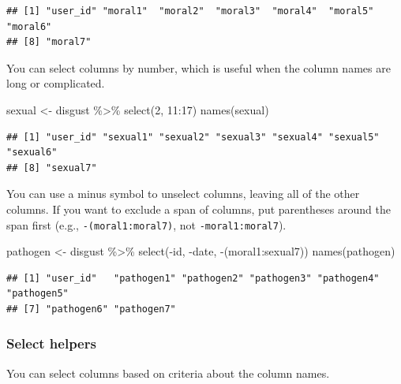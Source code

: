 \documentclass[
  oneside]{book}
\newenvironment{Shaded}{\begin{snugshade}}{\end{snugshade}}
\newcommand{\DecValTok}[1]{\textcolor[rgb]{0.00,0.00,0.81}{#1}}
\newcommand{\FunctionTok}[1]{\textcolor[rgb]{0.00,0.00,0.00}{#1}}
\newcommand{\NormalTok}[1]{#1}
\newcommand{\OtherTok}[1]{\textcolor[rgb]{0.56,0.35,0.01}{#1}}
\newcommand{\SpecialCharTok}[1]{\textcolor[rgb]{0.00,0.00,0.00}{#1}}
\begin{document}
\begin{verbatim}
## [1] "user_id" "moral1"  "moral2"  "moral3"  "moral4"  "moral5"  "moral6" 
## [8] "moral7"
\end{verbatim}

You can select columns by number, which is useful when the column names are long or complicated.

\begin{Shaded}
\begin{Highlighting}[]
\NormalTok{sexual }\OtherTok{\textless{}{-}}\NormalTok{ disgust }\SpecialCharTok{\%\textgreater{}\%} \FunctionTok{select}\NormalTok{(}\DecValTok{2}\NormalTok{, }\DecValTok{11}\SpecialCharTok{:}\DecValTok{17}\NormalTok{)}
\FunctionTok{names}\NormalTok{(sexual)}
\end{Highlighting}
\end{Shaded}

\begin{verbatim}
## [1] "user_id" "sexual1" "sexual2" "sexual3" "sexual4" "sexual5" "sexual6"
## [8] "sexual7"
\end{verbatim}

You can use a minus symbol to unselect columns, leaving all of the other columns. If you want to exclude a span of columns, put parentheses around the span first (e.g., \texttt{-(moral1:moral7)}, not \texttt{-moral1:moral7}).

\begin{Shaded}
\begin{Highlighting}[]
\NormalTok{pathogen }\OtherTok{\textless{}{-}}\NormalTok{ disgust }\SpecialCharTok{\%\textgreater{}\%} \FunctionTok{select}\NormalTok{(}\SpecialCharTok{{-}}\NormalTok{id, }\SpecialCharTok{{-}}\NormalTok{date, }\SpecialCharTok{{-}}\NormalTok{(moral1}\SpecialCharTok{:}\NormalTok{sexual7))}
\FunctionTok{names}\NormalTok{(pathogen)}
\end{Highlighting}
\end{Shaded}

\begin{verbatim}
## [1] "user_id"   "pathogen1" "pathogen2" "pathogen3" "pathogen4" "pathogen5"
## [7] "pathogen6" "pathogen7"
\end{verbatim}

\hypertarget{select_helpers}{%
\subsubsection{Select helpers}\label{select_helpers}}

You can select columns based on criteria about the column names.
\end{document}
